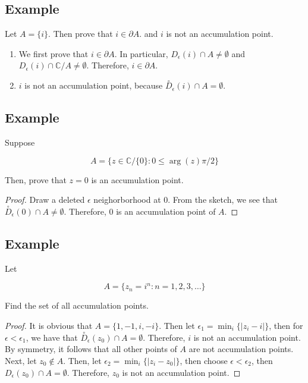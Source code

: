 \documentclass{article}
\newtheorem{one minute paper}[theorem]{One Minute Paper}
\begin{document}
\subsection*{Example}

Let $A = \{i\}$. Then prove that $i \in \partial A$. and $i$ is not an accumulation point. 

\begin{enumerate}
    \item We first prove that $i \in \partial A$. In particular, $D_{\epsilon}(i) \cap A \neq \emptyset$ and $D_{\epsilon}(i) \cap \mathbb{C}/A \neq \emptyset$. Therefore, $i \in \partial A$.
    \item $i$ is not an accumulation point, because $\overset{\circ}{D}_{\epsilon}(i) \cap A = \emptyset$. 
\end{enumerate}

\subsection*{Example}

Suppose 

\begin{equation}
    A = \{z \in \mathbb{C}/\{0\}: 0 \leq \arg(z)  \pi/2\}
\end{equation}

Then, prove that $z=0$ is an accumulation point. 

\begin{proof}
    Draw a deleted $\epsilon$ neighorborhood at $0$. From the sketch, we see that $\overset{\circ}{D}_{\epsilon}(0) \cap A \neq \emptyset$. Therefore, $0$ is an accumulation point of $A$. 
\end{proof}

\subsection*{Example}

Let

\begin{equation}
    A = \{z_n = i^n: n = 1,2,3,\dots\}
\end{equation}

Find the set of all accumulation points.

\begin{proof}
    It is obvious that $A = \{1,-1,i,-i\}$. Then let $\epsilon_1 = \min_i\{|z_i - i|\}$, then for $\epsilon < \epsilon_1$, we have that $\overset{\circ}{D}_{\epsilon}(z_0) \cap A = \emptyset$. Therefore, $i$ is not an accumulation point. By symmetry, it follows that all other points of $A$ are not accumulation points.  
    Next, let $z_0 \notin A$. Then, let $\epsilon_2 = \min_i\{|z_i - z_0|\}$, then choose $\epsilon < \epsilon_2$, then $D_{\epsilon}(z_0) \cap A = \emptyset$. Therefore, $z_0$ is not an accumulation point. 
\end{proof}
\end{document}
